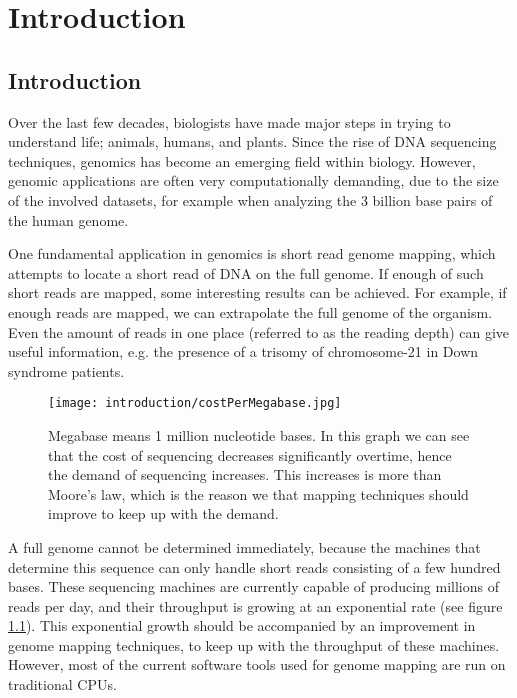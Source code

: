 
\chapter{Introduction}

\section{Introduction}
Over the last few decades, biologists have made major steps in trying to understand life; animals, humans, and plants. Since the rise of DNA sequencing techniques, genomics has become an emerging field within biology. However, genomic applications are often very computationally demanding, due to the size of the involved datasets, for example when analyzing the 3 billion base pairs of the human genome.

One fundamental application in genomics is short read genome mapping, which attempts to locate a short read of DNA on the full genome. If enough of such short reads are mapped, some interesting results can be achieved. For example, if enough reads are mapped, we can extrapolate the full genome of the organism. Even the amount of reads in one place (referred to as the reading depth) can give useful information, e.g. the presence of a trisomy of chromosome-21 in Down syndrome patients.

\begin{figure}[H]
	\centering
	\texttt{[image: introduction/costPerMegabase.jpg]}
	\caption{Megabase means 1 million nucleotide bases. In this graph we can see that the cost of sequencing decreases significantly overtime, hence the demand of sequencing increases. This increases is more than Moore's law, which is the reason we that mapping techniques should improve to keep up with the demand.}
	\label{fig:costMb}
\end{figure}

A full genome cannot be determined immediately, because the machines that determine this sequence can only handle short reads consisting of a few hundred bases. These sequencing machines are currently capable of producing millions of reads per day, and their throughput is growing at an exponential rate (see figure \ref{fig:costMb}). This exponential growth should be accompanied by an improvement in genome mapping techniques, to keep up with the throughput of these machines. However, most of the current software tools used for genome mapping are run on traditional CPUs. 

